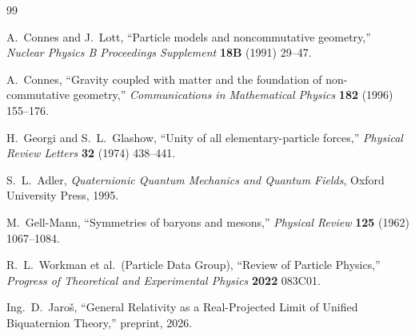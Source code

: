 \documentclass[12pt,a4paper]{article}
\theoremstyle{definition}
\theoremstyle{remark}
\begin{document}
\begin{thebibliography}{99}

A.~Connes and J.~Lott,
``Particle models and noncommutative geometry,''
\textit{Nuclear Physics B Proceedings Supplement} \textbf{18B} (1991) 29--47.

A.~Connes,
``Gravity coupled with matter and the foundation of non-commutative geometry,''
\textit{Communications in Mathematical Physics} \textbf{182} (1996) 155--176.

H.~Georgi and S.~L.~Glashow,
``Unity of all elementary-particle forces,''
\textit{Physical Review Letters} \textbf{32} (1974) 438--441.

S.~L.~Adler,
\textit{Quaternionic Quantum Mechanics and Quantum Fields},
Oxford University Press, 1995.

M.~Gell-Mann,
``Symmetries of baryons and mesons,''
\textit{Physical Review} \textbf{125} (1962) 1067--1084.

R.~L.~Workman et al.\ (Particle Data Group),
``Review of Particle Physics,''
\textit{Progress of Theoretical and Experimental Physics} \textbf{2022} 083C01.

Ing.~D.~Jaroš,
``General Relativity as a Real-Projected Limit of Unified Biquaternion Theory,''
preprint, 2026.

\end{thebibliography}
\end{document}
